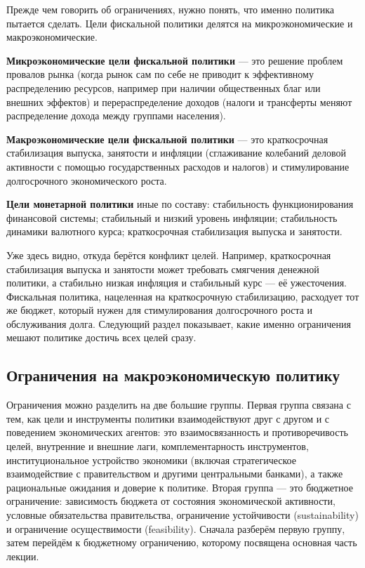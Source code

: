 \documentclass[11pt,a4paper]{article}
\begin{document}
Прежде чем говорить об ограничениях, нужно понять, что именно политика пытается сделать. Цели фискальной политики делятся на микроэкономические и макроэкономические.

\textbf{Микроэкономические цели фискальной политики} --- это решение проблем провалов рынка (когда рынок сам по себе не приводит к эффективному распределению ресурсов, например при наличии общественных благ или внешних эффектов) и перераспределение доходов (налоги и трансферты меняют распределение дохода между группами населения).

\textbf{Макроэкономические цели фискальной политики} --- это краткосрочная стабилизация выпуска, занятости и инфляции (сглаживание колебаний деловой активности с помощью государственных расходов и налогов) и стимулирование долгосрочного экономического роста.

\textbf{Цели монетарной политики} иные по составу: стабильность функционирования финансовой системы; стабильный и низкий уровень инфляции; стабильность динамики валютного курса; краткосрочная стабилизация выпуска и занятости.

Уже здесь видно, откуда берётся конфликт целей. Например, краткосрочная стабилизация выпуска и занятости может требовать смягчения денежной политики, а стабильно низкая инфляция и стабильный курс --- её ужесточения. Фискальная политика, нацеленная на краткосрочную стабилизацию, расходует тот же бюджет, который нужен для стимулирования долгосрочного роста и обслуживания долга. Следующий раздел показывает, какие именно ограничения мешают политике достичь всех целей сразу.

\subsection{Ограничения на макроэкономическую политику}

Ограничения можно разделить на две большие группы. Первая группа связана с тем, как цели и инструменты политики взаимодействуют друг с другом и с поведением экономических агентов: это взаимосвязанность и противоречивость целей, внутренние и внешние лаги, комплементарность инструментов, институциональное устройство экономики (включая стратегическое взаимодействие с правительством и другими центральными банками), а также рациональные ожидания и доверие к политике. Вторая группа --- это бюджетное ограничение: зависимость бюджета от состояния экономической активности, условные обязательства правительства, ограничение устойчивости (sustainability) и ограничение осуществимости (feasibility). Сначала разберём первую группу, затем перейдём к бюджетному ограничению, которому посвящена основная часть лекции.
\end{document}
